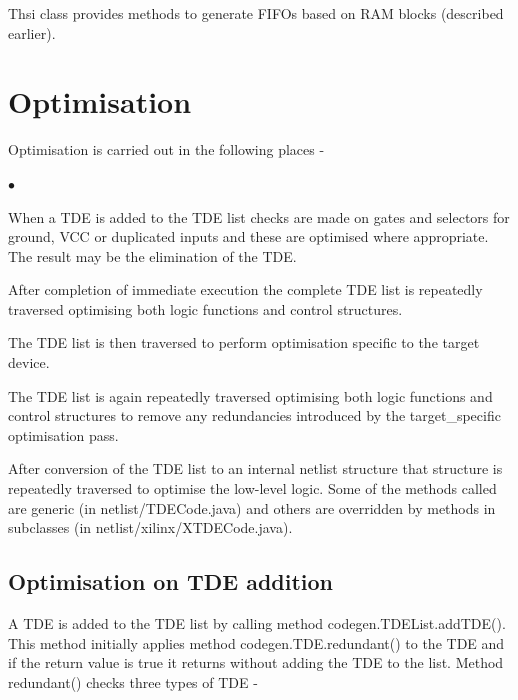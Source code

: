 \documentclass[10pt,a4paper,twoside,fleqn]{book}
\newcommand{\blist}{\begin{list}{$\bullet$}{\setlength{\itemsep}{-5pt}\setlength{\topsep}{-5pt}}}
\newcommand{\blend}{\end{list}}
\begin{document}
        Thsi class provides methods to generate FIFOs based on RAM blocks
        (described earlier).











\chapter{Optimisation}

    Optimisation is carried out in the following places -

    \blist
    \item   When a TDE is added to the TDE list checks are made on
            gates and selectors for ground, VCC or duplicated inputs
            and these are optimised where appropriate. The result may be
            the elimination of the TDE.
    \item   After completion of immediate execution the complete TDE list
            is repeatedly traversed optimising both logic functions and
            control structures.
    \item   The TDE list is then traversed to perform optimisation specific
            to the target device.
    \item   The TDE list is again repeatedly traversed optimising both
            logic functions and control structures to remove any
            redundancies introduced by the target\_specific optimisation
            pass.
    \item   After conversion of the TDE list to an internal netlist
            structure that structure is repeatedly traversed to optimise
            the low-level logic. Some of the methods called are generic
            (in netlist/TDECode.java) and others are overridden by methods
            in subclasses (in netlist/xilinx/XTDECode.java).
    \blend
    
    
    \section{Optimisation on TDE addition}
    
        A TDE is added to the TDE list by calling method
        codegen.TDEList.addTDE(). This method initially applies method
        codegen.TDE.redundant() to the TDE and if the return value is true it
        returns without adding the TDE to the list. Method redundant() checks
        three types of TDE -
\end{document}
